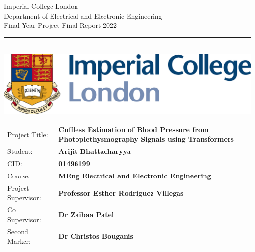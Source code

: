 \documentclass[12pt, a4paper,dvipsnames]{article}
\begin{document}
\thispagestyle{empty}

\begin{titlepage}
\setlength{\parindent}{0pt}
\setlength{\parskip}{0pt}
{
    \Large
    \raggedright
    Imperial College London\\[17pt]
    Department of Electrical and Electronic Engineering\\[17pt]
    Final Year Project Final Report 2022\\[17pt]
}

\rule{\columnwidth}{3pt}
\vfill
    \begin{center}
    \quad\\[1.1cm]
    \includegraphics[width=15cm]{logo2.png}\\[1cm] %
    \end{center}\vfill
\setlength{\tabcolsep}{0pt}

\begin{tabular}{p{40mm}p{\dimexpr\columnwidth-40mm}}
    Project Title: & \textbf{Cuffless Estimation of Blood Pressure from Photoplethysmography Signals using Transformers} \\[12pt]
    Student: & \textbf{Arijit Bhattacharyya} \\[12pt]
    CID: & \textbf{01496199} \\[12pt]
    Course: & \textbf{MEng Electrical and Electronic Engineering} \\[12pt]
    Project Supervisor: & \textbf{Professor Esther Rodriguez Villegas} \\[12pt]
    Co Supervisor: & \textbf{Dr Zaibaa Patel} \\[12pt]
    Second Marker: & \textbf{Dr Christos Bouganis} \\[12pt]
\end{tabular}
\end{titlepage}


\newpage
{}

\newpage

\newpage
\tableofcontents
\newpage
{}
\newpage


\newpage

\newpage
%

\newpage

%
\newpage

\newpage

%
\newpage

\newpage
\printbibliography[heading=bibintoc]
%

\newpage

\end{document}
